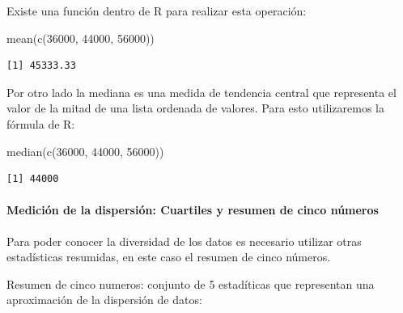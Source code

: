 \documentclass[
  letterpaper,
  DIV=11,
  numbers=noendperiod]{scrartcl}
\let\oldparagraph\paragraph
\renewcommand{\paragraph}[1]{\oldparagraph{#1}\mbox{}}
\newenvironment{Shaded}{\begin{snugshade}}{\end{snugshade}}
\newcommand{\DecValTok}[1]{\textcolor[rgb]{0.68,0.00,0.00}{#1}}
\newcommand{\FunctionTok}[1]{\textcolor[rgb]{0.28,0.35,0.67}{#1}}
\newcommand{\NormalTok}[1]{\textcolor[rgb]{0.00,0.23,0.31}{#1}}
\begin{document}
Existe una función dentro de R para realizar esta operación:

\begin{Shaded}
\begin{Highlighting}[]
\FunctionTok{mean}\NormalTok{(}\FunctionTok{c}\NormalTok{(}\DecValTok{36000}\NormalTok{, }\DecValTok{44000}\NormalTok{, }\DecValTok{56000}\NormalTok{))}
\end{Highlighting}
\end{Shaded}

\begin{verbatim}
[1] 45333.33
\end{verbatim}

Por otro lado la mediana es una medida de tendencia central que
representa el valor de la mitad de una lista ordenada de valores. Para
esto utilizaremos la fórmula de R:

\begin{Shaded}
\begin{Highlighting}[]
\FunctionTok{median}\NormalTok{(}\FunctionTok{c}\NormalTok{(}\DecValTok{36000}\NormalTok{, }\DecValTok{44000}\NormalTok{, }\DecValTok{56000}\NormalTok{))}
\end{Highlighting}
\end{Shaded}

\begin{verbatim}
[1] 44000
\end{verbatim}

\hypertarget{mediciuxf3n-de-la-dispersiuxf3n-cuartiles-y-resumen-de-cinco-nuxfameros}{%
\paragraph{Medición de la dispersión: Cuartiles y resumen de cinco
números}\label{mediciuxf3n-de-la-dispersiuxf3n-cuartiles-y-resumen-de-cinco-nuxfameros}}

Para poder conocer la diversidad de los datos es necesario utilizar
otras estadísticas resumidas, en este caso el resumen de cinco números.

Resumen de cinco numeros: conjunto de 5 estadíticas que representan una
aproximación de la dispersión de datos:
\end{document}

